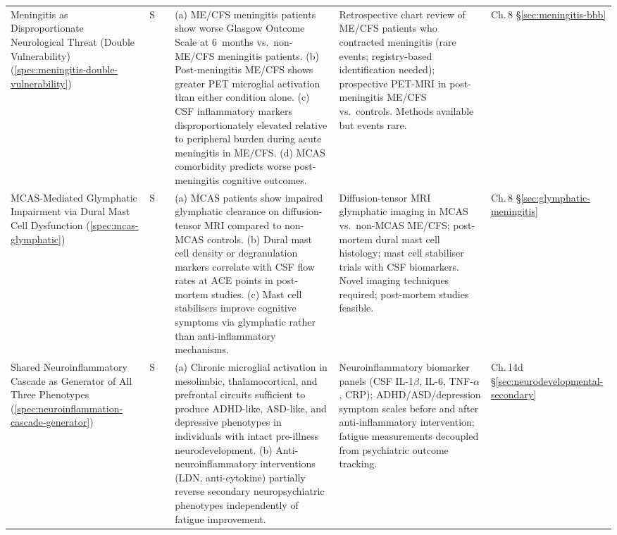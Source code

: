 \begin{longtable}{%
  p{3.0cm}
  >{\centering\arraybackslash}p{0.55cm}
  >{\centering\arraybackslash}p{1.0cm}
  p{3.8cm}
  p{3.8cm}
  p{2.2cm}
}
Meningitis as Disproportionate Neurological Threat (Double Vulnerability)
(\ref{spec:meningitis-double-vulnerability})
&
S & 0.35
&
(a) ME/CFS meningitis patients show worse Glasgow Outcome Scale at 6~months
vs.\ non-ME/CFS meningitis patients.
(b) Post-meningitis ME/CFS shows greater PET microglial activation than
either condition alone.
(c) CSF inflammatory markers disproportionately elevated relative to peripheral
burden during acute meningitis in ME/CFS.
(d) MCAS comorbidity predicts worse post-meningitis cognitive outcomes.
&
Retrospective chart review of ME/CFS patients who contracted meningitis
(rare events; registry-based identification needed);
prospective PET-MRI in post-meningitis ME/CFS vs.\ controls.
Methods available but events rare.
&
Ch.\,8 \S\ref{sec:meningitis-bbb} \\[6pt]

MCAS-Mediated Glymphatic Impairment via Dural Mast Cell Dysfunction
(\ref{spec:mcas-glymphatic})
&
S & 0.25
&
(a) MCAS patients show impaired glymphatic clearance on diffusion-tensor
MRI compared to non-MCAS controls.
(b) Dural mast cell density or degranulation markers correlate with CSF
flow rates at ACE points in post-mortem studies.
(c) Mast cell stabilisers improve cognitive symptoms via glymphatic
rather than anti-inflammatory mechanisms.
&
Diffusion-tensor MRI glymphatic imaging in MCAS vs.\ non-MCAS ME/CFS;
post-mortem dural mast cell histology; mast cell stabiliser trials
with CSF biomarkers. Novel imaging techniques required; post-mortem
studies feasible.
&
Ch.\,8 \S\ref{sec:glymphatic-meningitis} \\[6pt]

Shared Neuroinflammatory Cascade as Generator of All Three Phenotypes
(\ref{spec:neuroinflammation-cascade-generator})
&
S & 0.35
&
(a) Chronic microglial activation in mesolimbic, thalamocortical, and prefrontal
circuits sufficient to produce ADHD-like, ASD-like, and depressive phenotypes in
individuals with intact pre-illness neurodevelopment.
(b) Anti-neuroinflammatory interventions (LDN, anti-cytokine) partially reverse
secondary neuropsychiatric phenotypes independently of fatigue improvement.
&
Neuroinflammatory biomarker panels (CSF IL-1$\beta$, IL-6, TNF-$\alpha$, CRP);
ADHD/ASD/depression symptom scales before and after anti-inflammatory intervention;
fatigue measurements decoupled from psychiatric outcome tracking.
&
Ch.\,14d \S\ref{sec:neurodevelopmental-secondary} \\[6pt]


\end{longtable}
